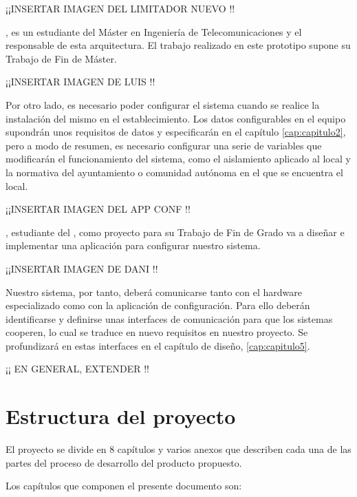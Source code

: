 ¡¡INSERTAR IMAGEN DEL LIMITADOR NUEVO !!


\myMateLuis, es un estudiante del Máster en Ingeniería de Telecomunicaciones y el responsable de esta arquitectura. El trabajo realizado en este prototipo supone su Trabajo de Fin de Máster.

¡¡INSERTAR IMAGEN DE LUIS !!

Por otro lado, es necesario poder configurar el sistema cuando se realice la instalación del mismo en el establecimiento. Los datos configurables en el equipo supondrán unos requisitos de datos y especificarán en el capítulo \ref{cap:capitulo2}, pero a modo de resumen, es necesario configurar una serie de variables que modificarán el funcionamiento del sistema, como el aislamiento aplicado al local y la normativa del ayuntamiento o comunidad autónoma en el que se encuentra el local.

¡¡INSERTAR IMAGEN DEL APP CONF !!

\myMateDani, estudiante del \myDegree, como proyecto para su Trabajo de Fin de Grado va a diseñar e implementar una aplicación para configurar nuestro sistema.

¡¡INSERTAR IMAGEN DE DANI !!

Nuestro sistema, por tanto, deberá comunicarse tanto con el hardware especializado como con la aplicación de configuración. Para ello deberán identificarse y definirse unas interfaces de comunicación para que los sistemas cooperen, lo cual se traduce en nuevo requisitos en nuestro proyecto. Se profundizará en estas interfaces en el capítulo de diseño, \ref{cap:capitulo5}.


¡¡ EN GENERAL, EXTENDER !!

\section{Estructura del proyecto}\label{sec:estructura}

El proyecto se divide en 8 capítulos y varios anexos que describen cada una de las partes del proceso de desarrollo del producto propuesto.

Los capítulos que componen el presente documento son:

